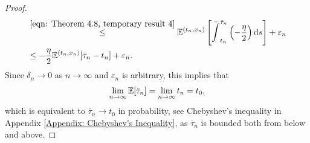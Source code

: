 \begin{proof}
\begin{align*}
        & \overset{\eqref{eqn: Theorem 4.8, temporary result 4}}{\leq} \mathbb{E}^{(t_n,x_n)} \left[\bar \int_{t_n}^{\bar \tau_n}  \left(- \frac{\eta}{2} \right) \mathrm{d} s\right] + \varepsilon_n \\
        & \leq -\frac{\eta}{2} \mathbb{E}^{(t_n,x_n)} [\bar \tau_n - t_n] + \varepsilon_n.
    \end{align*}
    Since $\delta_n \rightarrow 0$ as $n \rightarrow \infty$ and $\varepsilon_n$ is arbitrary, this implies that 
    \begin{equation*}
        \lim_{n \rightarrow \infty} \mathbb{E} [\bar \tau_n] = \lim_{n \rightarrow \infty} t_n = t_0,
    \end{equation*}
    which is equivalent to $\bar \tau_n \rightarrow t_0$ in probability, see Chebyshev's inequality in Appendix \ref{Appendix: Chebyshev's Inequality}, as $\bar \tau_n$ is bounded both from below and above. 


\end{proof}
